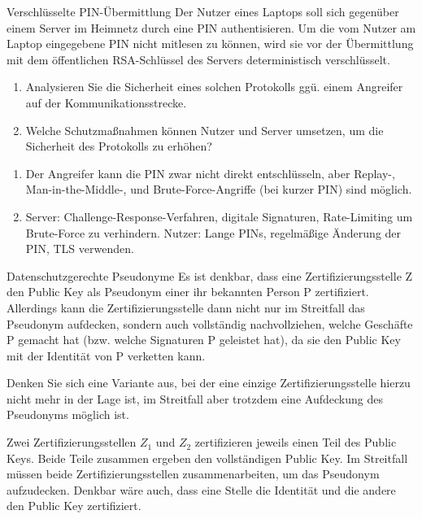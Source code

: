 \documentclass{article}
\begin{document}
\setcounter{subsection}{167}
\begin{exercise}{Verschlüsselte PIN-Übermittlung}
  Der Nutzer eines Laptops soll sich gegenüber einem Server im Heimnetz durch eine PIN authentisieren. Um die vom Nutzer am Laptop eingegebene PIN nicht mitlesen zu können, wird sie vor der Übermittlung mit dem öffentlichen RSA-Schlüssel des Servers deterministisch verschlüsselt.
  \begin{enumerate}
    \item Analysieren Sie die Sicherheit eines solchen Protokolls ggü. einem Angreifer auf der Kommunikationsstrecke.
    \item Welche Schutzmaßnahmen können Nutzer und Server umsetzen, um die Sicherheit des Protokolls zu erhöhen?
  \end{enumerate}

  \begin{solution}
    \begin{enumerate}
      \item Der Angreifer kann die PIN zwar nicht direkt entschlüsseln, aber Replay-, Man-in-the-Middle-, und Brute-Force-Angriffe (bei kurzer PIN) sind möglich.
      \item Server: Challenge-Response-Verfahren, digitale Signaturen, Rate-Limiting um Brute-Force zu verhindern. Nutzer: Lange PINs, regelmäßige Änderung der PIN, TLS verwenden.
    \end{enumerate}
  \end{solution}
\end{exercise}

\setcounter{subsection}{188}
\begin{exercise}{Datenschutzgerechte Pseudonyme}
  Es ist denkbar, dass eine Zertifizierungsstelle Z den Public Key als Pseudonym einer ihr bekannten Person P zertifiziert. Allerdings kann die Zertifizierungsstelle dann nicht nur im Streitfall das Pseudonym aufdecken, sondern auch vollständig nachvollziehen, welche Geschäfte P gemacht hat (bzw. welche Signaturen P geleistet hat), da sie den Public Key mit der Identität von P verketten kann.

  Denken Sie sich eine Variante aus, bei der eine einzige Zertifizierungsstelle hierzu nicht mehr in der Lage ist, im Streitfall aber trotzdem eine Aufdeckung des Pseudonyms möglich ist.

  \begin{solution}
    Zwei Zertifizierungsstellen $Z_1$ und $Z_2$ zertifizieren jeweils einen Teil des Public Keys. Beide Teile zusammen ergeben den vollständigen Public Key. Im Streitfall müssen beide Zertifizierungsstellen zusammenarbeiten, um das Pseudonym aufzudecken. Denkbar wäre auch, dass eine Stelle die Identität und die andere den Public Key zertifiziert.
  \end{solution}
\end{exercise}
\end{document}
